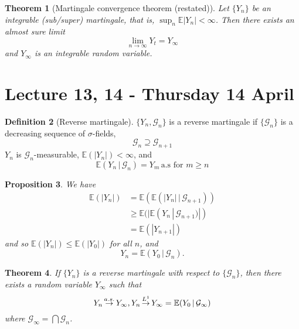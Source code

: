 \documentclass[10pt, oneside, reqno]{amsart}
\theoremstyle{plain}%
\newtheorem{thm}{Theorem}[section]
\newtheorem{prop}[thm]{Proposition}
\theoremstyle{definition}
\newtheorem{defn}[thm]{Definition}
\theoremstyle{remark}
\newcommand{\given}{ \, | \,}
\newcommand{\E}{\mathbb{E}}
\def\cas{\,{\buildrel a.s. \over \rightarrow}\,}
\def\clone{\,{\buildrel L^1 \over \rightarrow}\,}
\newcommand{\sigg}{\mathcal{G}}
\begin{document}
\begin{thm}[Martingale convergence theorem (restated)]
    Let $\{Y_n\}$ be an integrable (sub/super) martingale, that is, $\sup_n \E |Y_n| < \infty$.  Then there exists an almost sure limit \[
        \lim_{n \rightarrow \infty} Y_t = Y_\infty
    \] and $Y_\infty$ is an integrable random variable.
\end{thm}

\section{Lecture 13, 14 - Thursday 14 April} %
\label{sec:lecture_13_thursday_14_april}

\begin{defn}[Reverse martingale]
    $\{ Y_n , \sigg_n \}$ is a reverse martingale if $ \{ \sigg_n \}$ is a decreasing sequence of $\sigma$-fields, \[
        \sigg_n \supseteq \sigg_{n+1}
    \] $Y_n$ is $\sigg_n$-measurable, $\E(|Y_n|) < \infty$, and \[
        \E(Y_n \given \sigg_n) = Y_m \, \text{a.s for $m \geq n$}
    \]
\end{defn}

\begin{prop}
    We have \begin{align*}
        \E(|Y_n|) &= \E( \E(|Y_n| \given \sigg_{n+1})) \\
                    &\geq \E(| \E(Y_n \given \sigg_{n+1})|) \\
                    &= \E(|Y_{n+1}|)
    \end{align*}
    and so $\E(|Y_n|) \leq \E(|Y_0|)$ for all $n$, and \[
        Y_n = \E(Y_0 \given \sigg_n).
    \]
\end{prop}

\begin{thm}
    If $\{ Y_n \}$ is a reverse martingale with respect to $\{\sigg_n \}$, then there exists a random variable $Y_\infty$ such that \[
        Y_n \cas Y_\infty, Y_n \clone Y_\infty = \E(Y_0 \given \sigg_\infty)
    \] where $\sigg_\infty = \bigcap {\sigg_n}$.
\end{thm}
\end{document}
